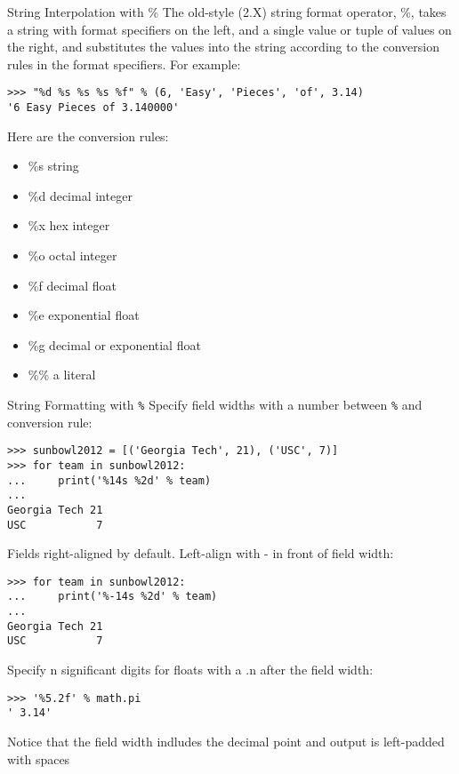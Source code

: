 \documentclass[smaller, aspectratio=1610]{beamer}
\begin{document}
\begin{frame}[label={sec:org69e6a2b},fragile]{String Interpolation with \%}
 The old-style (2.X) string format operator, \%, takes a string with format
specifiers on the left, and a single value or tuple of values on the right,
and substitutes the values into the string according to the conversion
rules in the format specifiers. For example:

\lstset{language=Python,label= ,caption= ,captionpos=b,numbers=none}
\begin{lstlisting}
>>> "%d %s %s %s %f" % (6, 'Easy', 'Pieces', 'of', 3.14)
'6 Easy Pieces of 3.140000'
\end{lstlisting}

Here are the conversion rules:

\begin{itemize}
\item \%s string
\item \%d decimal integer
\item \%x hex integer
\item \%o octal integer
\item \%f decimal float
\item \%e exponential float
\item \%g decimal or exponential float
\item \%\% a literal
\end{itemize}
\end{frame}

\begin{frame}[label={sec:org533594d},fragile]{String Formatting with \texttt{\%}}
 Specify field widths with a number between \texttt{\%} and conversion rule:

\lstset{language=Python,label= ,caption= ,captionpos=b,numbers=none}
\begin{lstlisting}
>>> sunbowl2012 = [('Georgia Tech', 21), ('USC', 7)]
>>> for team in sunbowl2012:
...     print('%14s %2d' % team)
...
Georgia Tech 21
USC           7
\end{lstlisting}
Fields right-aligned by default. Left-align with - in front of field width:

\lstset{language=Python,label= ,caption= ,captionpos=b,numbers=none}
\begin{lstlisting}
>>> for team in sunbowl2012:
...     print('%-14s %2d' % team)
...
Georgia Tech 21
USC           7
\end{lstlisting}

Specify n significant digits for floats with a .n after the field width:

\lstset{language=Python,label= ,caption= ,captionpos=b,numbers=none}
\begin{lstlisting}
>>> '%5.2f' % math.pi
' 3.14'
\end{lstlisting}
Notice that the field width indludes the decimal point and output is
left-padded with spaces
\end{frame}
\end{document}
